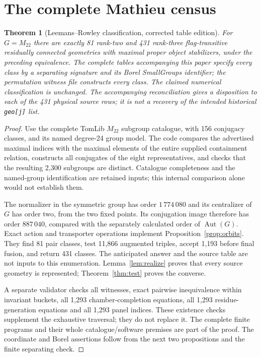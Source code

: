 \documentclass[11pt,a4paper]{article}
\newtheorem{theorem}{Theorem}\newtheorem{lemma}[theorem]{Lemma}\newtheorem{proposition}[theorem]{Proposition}
\newcommand{\Aut}{\operatorname{Aut}}\newcommand{\Stab}{\operatorname{Stab}}\newcommand{\cl}{\mathcal C}
\begin{document}
\section{The complete Mathieu census}
\begin{theorem}[Leemans--Rowley classification, corrected table edition]\label{thm:census}
For $G=M_{22}$ there are exactly 81 rank-two and 431 rank-three flag-transitive residually connected geometries with maximal proper object stabilizers, under the preceding equivalence. The complete tables accompanying this paper specify every class by a separating signature and its Borel SmallGroups identifier; the permutation witness file constructs every class. The claimed numerical classification is unchanged. The accompanying reconciliation gives a disposition to each of the 431 physical source rows; it is not a recovery of the intended historical \texttt{geo[j]} list.
\end{theorem}
\begin{proof}
Use the complete TomLib $M_{22}$ subgroup catalogue, with 156 conjugacy classes, and its named degree-24 group model. The code compares the advertised maximal indices with the maximal elements of the entire supplied containment relation, constructs all conjugates of the eight representatives, and checks that the resulting 2,300 subgroups are distinct. Catalogue completeness and the named-group identification are retained inputs; this internal comparison alone would not establish them.

The normalizer in the symmetric group has order $1\,774\,080$ and its centralizer of $G$ has order two, from the two fixed points. Its conjugation image therefore has order $887\,040$, compared with the separately calculated order of $\Aut(G)$. Exact action and transporter operations implement Proposition~\ref{prop:orbits}. They find 81 pair classes, test 11,866 augmented triples, accept 1,193 before final fusion, and return 431 classes. The anticipated answer and the source table are not inputs to this enumeration. Lemma~\ref{lem:realize} proves that every source geometry is represented; Theorem~\ref{thm:test} proves the converse.

A separate validator checks all witnesses, exact pairwise inequivalence within invariant buckets, all 1,293 chamber-completion equations, all 1,293 residue-generation equations and all 1,293 panel indices. These existence checks supplement the exhaustive traversal; they do not replace it. The complete finite programs and their whole catalogue/software premises are part of the proof. The coordinate and Borel assertions follow from the next two propositions and the finite separating check.
\end{proof}
\end{document}
